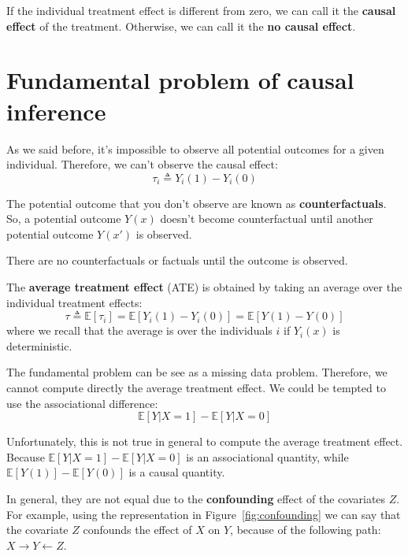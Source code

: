 \begin{note}
    If the individual treatment effect is different from zero, we can call it
    the \textbf{causal effect} of the treatment. Otherwise, we can call it the
    \textbf{no causal effect}.
\end{note}

\section{Fundamental problem of causal inference}
As we said before, it's impossible to observe all potential outcomes for a given
individual. Therefore, we can't observe the causal effect:
\begin{equation*}
    \tau_i \triangleq Y_i(1) - Y_i(0)
\end{equation*}

The potential outcome that you don't observe are known as \textbf{counterfactuals}.
So, a potential outcome $Y(x)$ doesn't become counterfactual until another
potential outcome $Y(x')$ is observed.

\begin{note}
    There are no counterfactuals or factuals until the outcome is observed.
\end{note}
\begin{definition}
    The \textbf{average treatment effect} (ATE) is obtained by taking an average
    over the individual treatment effects:
    \begin{equation}
        \tau \triangleq \mathbb{E}[\tau_i] = \mathbb{E}[Y_i(1) - Y_i(0)] = \mathbb{E}[Y(1) - Y(0)]
    \end{equation}
    where we recall that the average is over the individuals $i$ if $Y_i(x)$ is
    deterministic.
\end{definition}

The fundamental problem can be see as a missing data problem. Therefore, we cannot
compute directly the average treatment effect. We could be tempted to use the
associational difference:
\begin{equation}
    \mathbb{E}[Y|X = 1] - \mathbb{E}[Y|X = 0]
\end{equation}

Unfortunately, this is not true in general to compute the average treatment effect.
Because $\mathbb{E}[Y|X = 1] - \mathbb{E}[Y|X = 0]$ is an associational quantity,
while $\mathbb{E}[Y(1)] - \mathbb{E}[Y(0)]$ is a causal quantity.

In general, they are not equal due to the \textbf{confounding} effect of the covariates
$Z$. For example, using the representation in Figure~\ref{fig:confounding} we can
say that the covariate $Z$ confounds the effect of $X$ on $Y$, because of the
following path: $X \rightarrow Y \leftarrow Z$.

